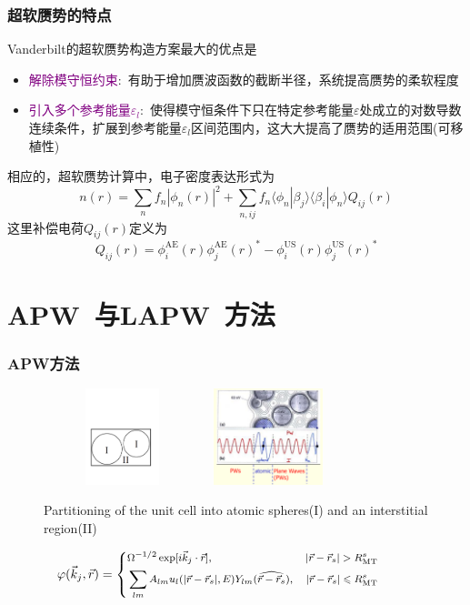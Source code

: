 \frame
{
\frametitle{超软赝势的特点}
\textrm{Vanderbilt}的超软赝势构造方案最大的优点是
\begin{itemize}
	\item \textcolor{purple}{解除模守恒约束}:~有助于增加赝波函数的截断半径，系统提高赝势的柔软程度
	\item \textcolor{purple}{引入多个参考能量$\varepsilon_l$}:~使得模守恒条件下只在特定参考能量$\varepsilon$处成立的对数导数连续条件，扩展到参考能量$\varepsilon_l$区间范围内，这大大提高了赝势的适用范围(可移植性)
\end{itemize}

相应的，超软赝势计算中，电子密度表达形式为
\begin{displaymath}
	n(r)=\sum_nf_n|\phi_n(r)|^2+\sum_{n,ij}f_n\langle\phi_n|\beta_j\rangle\langle\beta_i|\phi_n\rangle Q_{ij}(r)
\end{displaymath}
这里补偿电荷$Q_{ij}(r)$定义为
\begin{displaymath}
	Q_{ij}(r)=\phi_i^{\mathrm{AE}}(r)\phi_j^{\mathrm{AE}}(r)^{\ast}-\phi_i^{\mathrm{US}}(r)\phi_j^{\mathrm{US}}(r)^{\ast}
\end{displaymath}
}

\section{\rm{APW~}与\rm{LAPW~}方法}
\frame
{
\frametitle{\textrm{APW}方法}
\begin{figure}[h!]
\centering
\includegraphics[height=1.10in,width=1.80in,viewport=40 150 545 465,clip]{Figures/Muffin_tin.pdf}
\includegraphics[height=1.10in,width=1.45in,viewport=1 20 485 435,clip]{Figures/APW.png}
\caption{\tiny \textrm{Partitioning of the unit cell into atomic spheres(I) and an interstitial region(II)}}%
\label{Muffin_tin-2}
\end{figure}
\begin{displaymath}
\hskip -28pt\footnotesize \varphi(\vec k_j,\vec r)=\left\{
  \begin{aligned}
    &\Omega^{-1/2}\exp[i\vec k_j\cdot\vec r],&|\vec r-\vec r_s|>R_{\mathrm{MT}}^s\\
    &\sum_{lm}A_{lm}u_l(|\vec r-\vec r_s|,E)Y_{lm}(\widehat{\vec r-\vec r_s}),&|\vec r-\vec r_s|\leqslant R_{\mathrm{MT}}^s
  \end{aligned}
\right.
\end{displaymath}
}

